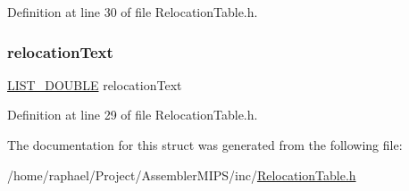 Definition at line 30 of file Relocation\+Table.\+h.

\mbox{\label{struct_r_e_l_o_c_a_t_i_o_n_t_a_b_l_e_a64feab00683ccf2635243aa94f497f76}} 
\subsubsection{\texorpdfstring{relocation\+Text}{relocationText}}
{\footnotesize\ttfamily \mbox{\hyperlink{_double_list_generic_8h_a1e5b384fadfbaaa8da74a3c3212fae13}{L\+I\+S\+T\+\_\+\+D\+O\+U\+B\+LE}} relocation\+Text}



Definition at line 29 of file Relocation\+Table.\+h.



The documentation for this struct was generated from the following file\+:\begin{DoxyCompactItemize}
\item 
/home/raphael/\+Project/\+Assembler\+M\+I\+P\+S/inc/\mbox{\hyperlink{_relocation_table_8h}{Relocation\+Table.\+h}}\end{DoxyCompactItemize}
